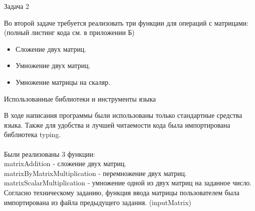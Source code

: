 \begin{large}
	Задача 2\\
\end{large}
Во второй задаче требуется реализовать три функции для операций с матрицами: (полный листинг кода см. в приложении Б)\\
\begin{itemize}
	\item Сложение двух матриц.
	\item Умножение двух матриц.
	\item Умножение матрицы на скаляр.\\
\end{itemize}

\begin{large}
	Использованные библиотеки и инструменты языка\\
\end{large}
В ходе написания программы были использованы только стандартные средства языка. Также для удобства и лучшей читаемости кода была импортирована библиотека typing.\\\\
Были реализованы 3 функции:\\
matrixAddition - сложение двух матриц.\\
matrixByMatrixMultiplication - перемножение двух матриц.\\
matrixScalarMultiplication - умножение одной из двух матриц на заданное число.\\
Согласно техническому заданию, функция ввода матрицы пользователем была импортирована из файла предыдущего задания. (inputMatrix)

